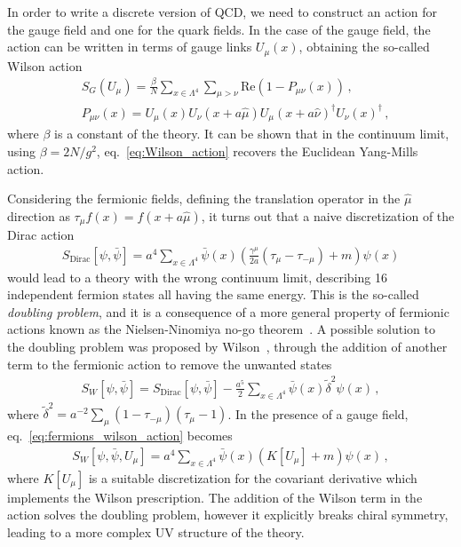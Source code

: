 %
In order to write a discrete version of QCD, we need to construct an action for the gauge field and one for the quark fields.
In the case of the gauge field, the action can be written in terms of gauge links $U_{\mu}\left(x\right)$, obtaining the so-called Wilson action
\begin{align}
    \label{eq:Wilson_action}
    &S_G\left(U_{\mu}\right) = 
    \frac{\beta}{N}\sum_{x\in \Lambda^4}\sum_{\mu>\nu}\text{Re}\left(1-P_{\mu\nu}\left(x\right)\right)\,, \\
    &P_{\mu\nu}\left(x\right) = U_{\mu}\left(x\right)U_{\nu}\left(x+a\hat{\mu}\right)
    U_{\mu}\left(x+a\hat{\nu}\right)^{\dagger}U_{\nu}\left(x\right)^{\dagger}\,,
\end{align}
where $\beta$ is a constant of the theory. It can be shown that in the continuum limit,
using $\beta=2N/g^2$, eq.~\eqref{eq:Wilson_action}
recovers the Euclidean Yang-Mills action.

%
Considering the fermionic fields, defining the translation operator in the $\hat{\mu}$ direction as 
$\tau_{\mu}f\left(x\right) = f\left(x+a\hat{\mu}\right)$, 
it turns out that a naive discretization of the Dirac action
\begin{align}
    \label{eq:naive_Dirac}
    S_{\text{Dirac}}\left[\psi,\bar{\psi}\right] = 
    a^4\sum_{x\in\Lambda^4}\bar{\psi}\left(x\right)\left(\frac{\gamma^{\mu}}{2a}\left(\tau_{\mu}-\tau_{-\mu}\right) + m\right) \psi\left(x\right)
\end{align}
would lead to a theory with the wrong continuum limit, describing 16 independent fermion states all having the same energy.
This is the so-called \textit{doubling problem}, and it is a consequence of a more general property of 
fermionic actions known as the Nielsen-Ninomiya no-go theorem~\cite{Nielsen:1981hk}.
A possible solution to the doubling problem was proposed by Wilson~\cite{PhysRevD.10.2445}, through the addition of another term to the fermionic action
to remove the unwanted states
\begin{align}
    \label{eq:fermions_wilson_action}
    S_W\left[\psi,\bar{\psi}\right] = S_{\text{Dirac}}\left[\psi,\bar{\psi}\right] 
    - \frac{a^5}{2}\sum_{x\in\Lambda^4}\bar{\psi}\left(x\right)\tilde{\delta}^2 \psi\left(x\right)\,,
\end{align}
where $\tilde{\delta}^2 = a^{-2}\sum_{\mu}\left(1-\tau_{-\mu}\right)\left(\tau_{\mu}-1\right)$.
In the presence of a gauge field, eq.~\eqref{eq:fermions_wilson_action} becomes 
\begin{align}
    S_W\left[\psi,\bar{\psi}, U_{\mu}\right] = a^4\sum_{x\in\Lambda^4}\bar{\psi}\left(x\right)\left(K\left[U_{\mu}\right] + m\right)\psi\left(x\right)\,,
\end{align}
where $K\left[U_{\mu}\right]$ is a suitable discretization for the covariant derivative which implements
the Wilson prescription. 
The addition of the Wilson term in the action solves the doubling problem, however it explicitly breaks
chiral symmetry, leading to a more complex UV structure of the theory.

